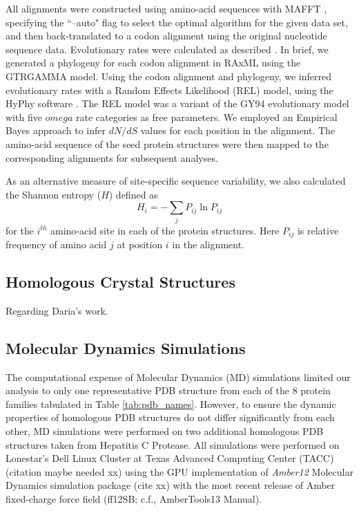\documentclass[12pt]{article}
\begin{document}
All alignments were constructed using amino-acid sequences with MAFFT \citep{Katohetal2002,Katohetal2005}, specifying the ``--auto" flag to select the optimal algorithm for the given data set, and then back-translated to a codon alignment using the original nucleotide sequence data. Evolutionary rates were calculated as described \citep{SpielmanWilke2013}. In brief, we generated a phylogeny for each codon alignment in RAxML \citep{RaxMLHPC} using the GTRGAMMA model. Using the codon alignment and phylogeny, we inferred evolutionary rates with a Random Effects Likelihood (REL) model, using the HyPhy software \citep{KosakovskyPondetal2005}. The REL model was a variant of the GY94 evolutionary model \citep{GoldmanYang1994} with five $omega$ rate categories as free parameters. We employed an Empirical Bayes approach \citep{Yang2000} to infer $dN/dS$ values for each position in the alignment. The amino-acid sequence of the seed protein structures were then mapped to the corresponding alignments for subsequent analyses.

As an alternative measure of site-specific sequence variability, we also calculated the Shannon entropy ($H$) defined as
\begin{equation}
\label{eqn:entropy}
        H_i = - \sum_jP_{ij}\ln P_{ij}
\end{equation}
for the $i^{th}$ amino-acid site in each of the protein structures. Here $P_{ij}$ is relative frequency of amino acid $j$ at position $i$ in the alignment.


\subsection*{Homologous Crystal Structures}

        Regarding Daria's work.

\subsection*{Molecular Dynamics Simulations}

The computational expense of Molecular Dynamics (MD) simulations limited our analysis to only one representative PDB structure from each of the $8$ protein families tabulated in Table \ref{tab:pdb_names}. However, to ensure the dynamic properties of homologous PDB structures do not differ significantly from each other, MD simulations were performed on two additional homologous PDB structures taken from Hepatitis C Protease. All simulations were performed on Lonestar's Dell Linux Cluster at Texas Advanced Computing Center (TACC) (citation maybe needed xx) using the GPU implementation of {\it Amber12} Molecular Dynamics simulation package (cite xx) with the most recent release of Amber fixed-charge force field (ff12SB; c.f., AmberTools13 Manual).
		
\end{document}
